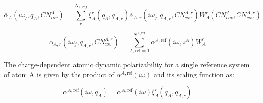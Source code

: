 \begin{equation}
  \overline{\alpha}_A(i\omega_j, q_A, CN_{cov}^A) = \sum_{r}^{N_{A,ref}} \xi_A^r (q_A, q_{A,r}) \overline{\alpha}_{A,r}(i\omega_j, q_{A,r}, CN_{cov}^{A,r}) W_A^r(CN_{cov}^A, CN_{cov}^{A,r})
\end{equation}

\begin{equation}
  \overline{\alpha}_{A,r}(i\omega_j, q_{A,r}, CN_{cov}^{A,r}) = \sum_{A,\text{ref}=1}^{N^{A,\text{ref}}} \alpha^{A,\text{ref}} (i\omega, z^A) W_A^r
\end{equation}

%
%

%
%

\noindent
The charge-dependent atomic dynamic polarizability for a single reference system of atom A is given by the product of \(\alpha^{A,\text{ref}}(i\omega)\) and its scaling function as:

\begin{equation}
  \alpha^{A,\text{ref}}(i\omega, q_A) = \alpha^{A,\text{ref}}(i\omega) \xi_A^r(q_A, q_{A,r})
\end{equation}


